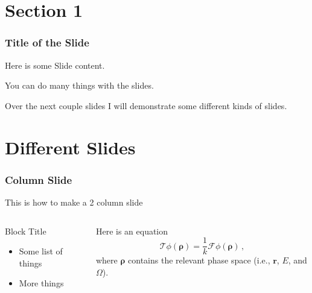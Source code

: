 \documentclass[fleqn]{beamer}
\begin{document}











    \section{Section 1}
    
    \begin{frame}
        \frametitle{Title of the Slide}
        Here is some Slide content.
        
        You can do many things with the slides.
        
        Over the next couple slides I will demonstrate some different kinds of slides.
    \end{frame}
    
    \section{Different Slides} %
    \begin{frame}
        \frametitle{Column Slide}
        This is how to make a 2 column slide
        \begin{columns}[c]
            \begin{column}{0.5\textwidth} %
                \begin{block}{Block Title}
                    \begin{itemize}
                        \item Some list of things
                        \item More things
                    \end{itemize}
                \end{block}
            \end{column}
            
            \begin{column}{0.5\textwidth} %
                Here is an equation
                \begin{equation}
                    \mathcal{T} \phi(\bm{\rho}) = \frac{1}{k} \mathcal{F} \phi(\bm{\rho}) \, , \nonumber
                \end{equation}
                where $\bm{\rho}$ contains the relevant phase space (i.e., $\mathbf{r}$, $E$, and $\Omega$).
            \end{column}
        \end{columns}
    \end{frame}
    
\end{document}
